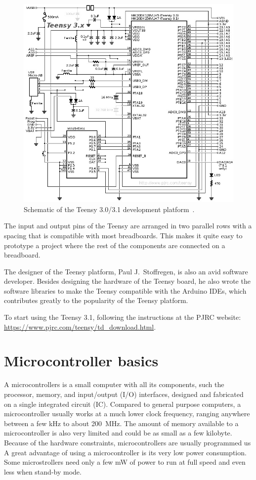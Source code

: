 \documentclass[letterpaper, 11pt]{article}
\begin{document}
\begin{figure}[ht]
	\centering
	\includegraphics[width=4.5in]{teensy_sch.png}
	\caption{Schematic of the Teensy 3.0/3.1 development platform~\cite{bib:teensy_sch}.}
	\label{fig:teensy_sch}
\end{figure}


The input and output pins of the Teensy are arranged in two parallel rows with a spacing that is compatible with most breadboards. This makes it quite easy to prototype a project where the rest of the components are connected on a breadboard.

The designer of the Teensy platform, Paul J.~Stoffregen, is also an avid software developer. Besides designing the hardware of the Teensy board, he also wrote the software libraries to make the Teensy compatible with the Arduino IDEs, which contributes greatly to the popularity of the Teensy platform. 

To start using the Teensy 3.1, following the instructions at the PJRC website: \url{https://www.pjrc.com/teensy/td_download.html}.


\section{Microcontroller basics}
A microcontrollers is a small computer with all its components, such the processor, memory, and input/output (I/O) interfaces, designed and fabricated on a single integrated circuit (IC). Compared to general purpose computers, a microcontroller usually works at a much lower clock frequency, ranging anywhere between a few kHz to about \SI{200}{\mega\hertz}. The amount of memory available to a microcontroller is also very limited and could be as small as a few kilobyte. Because of the hardware constraints, microcontrollers are usually programmed  us A great advantage of using a microcontroller is its very low power consumption. Some microstrollers need only a few mW of power to run at full speed and even less when stand-by mode. 
\end{document}
